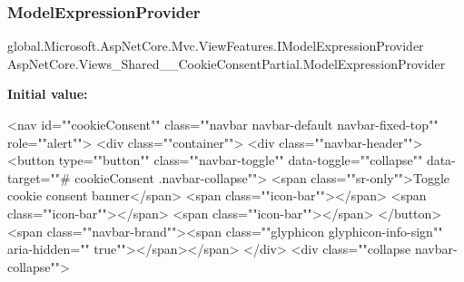\subsubsection{\texorpdfstring{Model\+Expression\+Provider}{ModelExpressionProvider}}
{\footnotesize\ttfamily global.\+Microsoft.\+Asp\+Net\+Core.\+Mvc.\+View\+Features.\+I\+Model\+Expression\+Provider Asp\+Net\+Core.\+Views\+\_\+\+Shared\+\_\+\+\_\+\+Cookie\+Consent\+Partial.\+Model\+Expression\+Provider\hspace{0.3cm}{\ttfamily [get]}}

{\bfseries Initial value\+:}
\begin{DoxyCode}
    <nav \textcolor{keywordtype}{id}=\textcolor{stringliteral}{""}cookieConsent\textcolor{stringliteral}{""} \textcolor{keyword}{class}=\textcolor{stringliteral}{""}navbar navbar-\textcolor{keywordflow}{default} navbar-fixed-top\textcolor{stringliteral}{""} role=\textcolor{stringliteral}{""}alert\textcolor{stringliteral}{""}>
        <div \textcolor{keyword}{class}=\textcolor{stringliteral}{""}container\textcolor{stringliteral}{""}>
            <div \textcolor{keyword}{class}=\textcolor{stringliteral}{""}navbar-header\textcolor{stringliteral}{""}>
                <button type=\textcolor{stringliteral}{""}button\textcolor{stringliteral}{""} \textcolor{keyword}{class}=\textcolor{stringliteral}{""}navbar-toggle\textcolor{stringliteral}{""} data-toggle=\textcolor{stringliteral}{""}collapse\textcolor{stringliteral}{""} data-target=\textcolor{stringliteral}{""}#
      cookieConsent .navbar-collapse\textcolor{stringliteral}{""}>
                    <span \textcolor{keyword}{class}=\textcolor{stringliteral}{""}sr-only\textcolor{stringliteral}{""}>Toggle cookie consent banner</span>
                    <span \textcolor{keyword}{class}=\textcolor{stringliteral}{""}icon-bar\textcolor{stringliteral}{""}></span>
                    <span \textcolor{keyword}{class}=\textcolor{stringliteral}{""}icon-bar\textcolor{stringliteral}{""}></span>
                    <span \textcolor{keyword}{class}=\textcolor{stringliteral}{""}icon-bar\textcolor{stringliteral}{""}></span>
                </button>
                <span \textcolor{keyword}{class}=\textcolor{stringliteral}{""}navbar-brand\textcolor{stringliteral}{""}><span \textcolor{keyword}{class}=\textcolor{stringliteral}{""}glyphicon glyphicon-info-sign\textcolor{stringliteral}{""} aria-hidden=\textcolor{stringliteral}{""}\textcolor{keyword}{
      true}\textcolor{stringliteral}{""}></span></span>
            </div>
            <div \textcolor{keyword}{class}=\textcolor{stringliteral}{""}collapse navbar-collapse\textcolor{stringliteral}{""}>

\end{DoxyCode}
